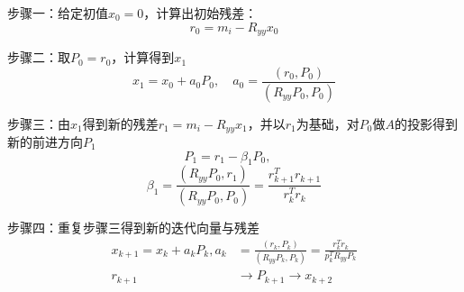 步骤一：给定初值$x_0=0$，计算出初始残差：
\begin{equation}
	r_0=m_i-R_{yy}x_0
\end{equation}

步骤二：取$P_0=r_0$，计算得到$x_1$
\begin{equation}
	x_1=x_0+a_0P_0, \quad a_0=\frac{(r_0,P_0)}{(R_{yy}P_0,P_{0})}
\end{equation}

步骤三：由$x_1$得到新的残差$r_1=m_i-R_{yy}x_1$，并以$r_1$为基础，对$P_0$做$A$的投影得到新的前进方向$P_1$
\begin{equation}
	P_1=r_1-\beta_1 P_0,\quad 
\end{equation}
\begin{equation}
\beta_1=\frac{(R_{yy}P_0,r_1)}{(R_{yy}P_0,P_0)}= \frac{r_{k+1}^T r_{k+1}}{r_k^T r_k} 
\end{equation}

步骤四：重复步骤三得到新的迭代向量与残差
\begin{equation}
	\begin{aligned}
		x_{k+1} = x_k+a_kP_k, a_k&=\frac{(r_k,P_k)}{(R_{yy}P_k,P_k)}= \frac{r_k^T r_k}{p_k^T R_{yy} P_k} \\
		r_{k+1} &\to P_{k+1} \to x_{k+2}
	\end{aligned}
\end{equation}

